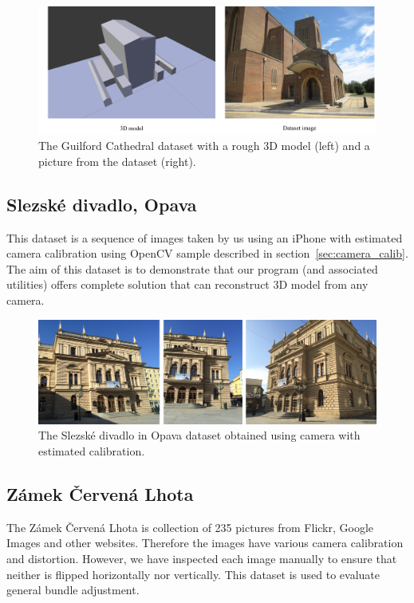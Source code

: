 \begin{figure}[ht]
	\begin{center}
		\includegraphics[keepaspectratio,width=\textwidth]{fig/experiments-cathedral.pdf}
	\end{center}
	\caption{The Guilford Cathedral dataset with a rough 3D model (left) and a picture from the dataset (right).}
	\label{fig:cathedral}
\end{figure}

\subsection*{Slezské divadlo, Opava}
This dataset is a sequence of images taken by us using an iPhone with estimated camera calibration using OpenCV sample described in section~\ref{sec:camera_calib}. The aim of this dataset is to demonstrate that our program (and associated utilities) offers complete solution that can reconstruct 3D model from any camera.

\begin{figure}[ht]
	\begin{center}
		\includegraphics[keepaspectratio,width=\textwidth]{fig/experiments-divadlo.pdf}
	\end{center}
	\caption{The Slezské divadlo in Opava dataset obtained using camera with estimated calibration.}
	\label{fig:divadlo}
\end{figure}

\subsection*{Zámek Červená Lhota}
The Zámek  Červená Lhota is collection of 235 pictures from Flickr, Google Images and other websites. Therefore the images have various camera calibration and distortion. However, we have inspected each image manually to ensure that neither is flipped horizontally nor vertically. This dataset is used to evaluate general bundle adjustment.

